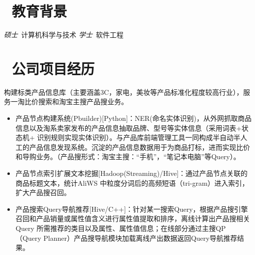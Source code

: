 \documentclass{resume}
\begin{document}



\section{\faGraduationCap\  教育背景}
\textit{硕士}\ 计算机科学与技术
\textit{学士}\ 软件工程

\section{\faUsers\ 公司项目经历}
\begin{onehalfspacing}
构建标类产品信息库（主要涵盖3C，家电，美妆等产品标准化程度较高行业），服务一淘比价搜索和淘宝主搜产品搜业务。
\begin{itemize}
  \item 产品节点构建系统(Pbuilder)[Python]：NER(命名实体识别)，从外网抓取商品信息以及淘系卖家发布的产品信息抽取品牌、型号等实体信息（采用词表+状态机+ 识别规则实现实体识别）。与产品库前端管理工具一同构成半自动半人工的产品信息发现系统。沉淀的产品信息数据用于为商品打标，进而实现比价和导购业务。（产品搜形式：淘宝主搜：“手机”，“笔记本电脑”等Query）。
  \item 产品节点索引扩展文本挖掘[Hadoop(Streaming)/Hive]：通过产品节点关联的商品标题文本，统计AliWS 中粒度分词后的高频短语（tri-gram）进入索引，扩大产品搜召回。
  \item 产品搜索Query导航推荐[Hive/C++]：针对某一搜索Query，根据产品搜引擎召回和产品销量或属性值含义进行属性值提取和排序，离线计算出产品搜相关Query 所需推荐的类目以及属性、属性值信息；在线部分通过主搜QP （Query Planner）产品搜导航模块加载离线产出数据返回Query导航推荐结果。
\end{itemize}
\end{onehalfspacing}
\end{document}
